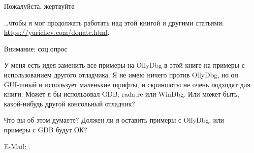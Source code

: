 \vspace*{\fill}

\huge Пожалуйста, жертвуйте
\normalsize

\bigskip
\bigskip
\bigskip

\dots чтобы я мог продолжать работать над этой книгой и другими статьями: \\
\url{https://yurichev.com/donate.html}.

\bigskip
\bigskip
\bigskip

\huge Внимание: соц.опрос
\normalsize

\bigskip
\bigskip
\bigskip

У меня есть идея заменить все примеры на OllyDbg в этой книге на примеры с использованием другого отладчика.
Я не имею ничего против OllyDbg, но он GUI-шный и использует маленькие шрифты, и скриншоты не очень подходят для книги.
Может я бы использовал GDB, rada.re или WinDbg.
Или может быть, какой-нибудь другой консольный отладчик?

Что вы об этом думаете?
Должен ли я оставить примеры с OllyDbg, или примеры с GDB будут ОК?

E-Mail: \GTT{\EMAIL}.

\vspace*{\fill}
\vfill
